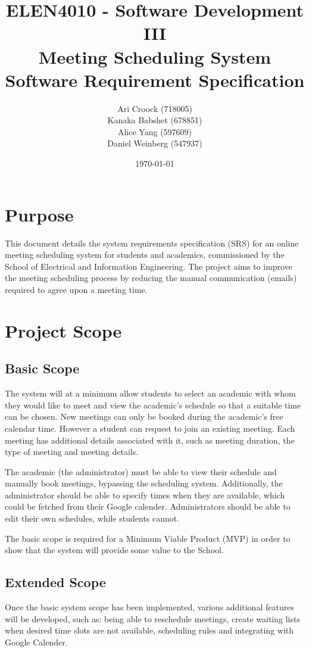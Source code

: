 \documentclass[11pt, a4paper]{article}
\title{ELEN4010 - Software Development III\\Meeting Scheduling System\\Software Requirement Specification}
\author{Ari Croock (718005)\\Kanaka Babshet (678851)\\Alice Yang (597609)\\Daniel Weinberg (547937)}
\date{\today}
\begin{document}
	\maketitle
	\section{Purpose}
	This document details the system requirements specification (SRS) for an online meeting scheduling system for students and academics, commissioned by the School of Electrical and Information Engineering. The project aims to improve the meeting scheduling process by reducing the manual communication (emails) required to agree upon a meeting time.
	
	\section{Project Scope}
	\subsection{Basic Scope}
	The system will at a minimum allow students to select an academic with whom they would like to meet and view the academic's schedule so that a suitable time can be chosen. New meetings can only be booked during the academic's free calendar time. However a student can request to join an existing meeting. Each meeting has additional details associated with it, such as meeting duration, the type of meeting and meeting details.
	
	The academic (the administrator) must be able to view their schedule and manually book meetings, bypassing the scheduling system. Additionally, the administrator should be able to specify times when they are available, which could be fetched from their Google calender. Administrators should be able to edit their own schedules, while students cannot.
	
	The basic scope is required for a Minimum Viable Product (MVP) in order to show that the system will provide some value to the School.
	
	\subsection{Extended Scope}
	Once the basic system scope has been implemented, various additional features will be developed, such as: being able to reschedule meetings, create waiting lists when desired time slots are not available, scheduling rules and integrating with Google Calender.
	
\end{document}
